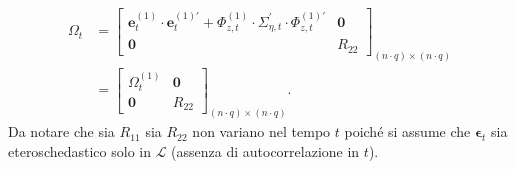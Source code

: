 \begin{equation}
	\begin{split}
		\Omega_t & = \begin{bmatrix}
			\mathbf{e}_t^{(1)}\cdot\mathbf{e}_t^{(1)\prime} + \Phi_{z, t}^{(1)}\cdot\Sigma_{\eta, t}^\prime\cdot\Phi_{z, t}^{(1)\prime} & \mathbf{0} \\
			\mathbf{0} & R_{22}
		\end{bmatrix}_{(n\cdot q)\times(n\cdot q)} \\
	 & = \begin{bmatrix}
	 	\Omega_t^{(1)} & \mathbf{0} \\
	 	\mathbf{0} & R_{22}
	 \end{bmatrix}_{(n\cdot q)\times(n\cdot q)}.
	\end{split}
\end{equation}
Da notare che sia $R_{11}$ sia $R_{22}$ non variano nel tempo $t$ poiché si assume che $\boldsymbol{\epsilon}_t$ sia eteroschedastico solo in $\mathcal{L}$ (assenza di autocorrelazione in $t$).